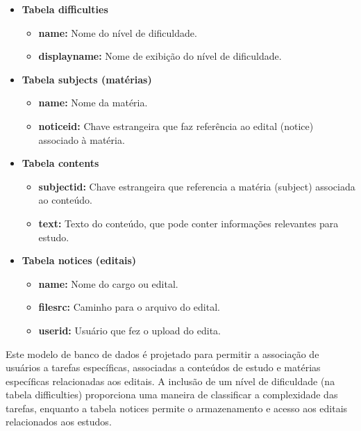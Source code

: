 \begin{itemize}
    \item \textbf{Tabela difficulties}
    
    \begin{itemize}
    \item \textbf{name:} Nome do nível de dificuldade.
    \item \textbf{displayname:} Nome de exibição do nível de dificuldade.
    \end{itemize}
    
    \item \textbf{Tabela subjects (matérias)}
    \begin{itemize}
    \item \textbf{name:} Nome da matéria.
    \item \textbf{noticeid:} Chave estrangeira que faz referência ao edital (notice) associado à matéria.
    \end{itemize}
    
    \item \textbf{Tabela contents}
    \begin{itemize}
    \item \textbf{subjectid:} Chave estrangeira que referencia a matéria (subject) associada ao conteúdo. 
    \item \textbf{text:} Texto do conteúdo, que pode conter informações relevantes para estudo.
    \end{itemize}
    
    \item \textbf{Tabela notices (editais)}
    \begin{itemize}
    \item \textbf{name:} Nome do cargo ou edital.
    \item \textbf{filesrc:} Caminho para o arquivo do edital. 
    \item \textbf{userid:} Usuário que fez o upload do edita.
    \end{itemize}
    
\end{itemize}

Este modelo de banco de dados é projetado para permitir a associação de usuários a tarefas específicas, associadas a conteúdos de estudo e matérias específicas relacionadas aos editais. A inclusão de um nível de dificuldade (na tabela difficulties) proporciona uma maneira de classificar a complexidade das tarefas, enquanto a tabela notices permite o armazenamento e acesso aos editais relacionados aos estudos.

